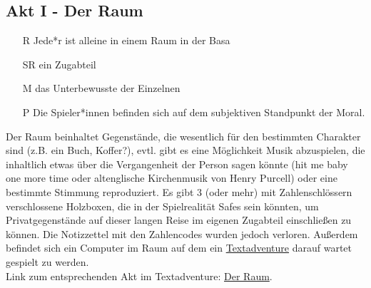 \documentclass[12pt, a4paper, openany]{report}
\begin{document}
\subsection{Akt I - Der Raum}
\begin{itemize}
\item[R] Jede*r ist alleine in einem Raum in der Basa
\item[SR] ein Zugabteil 
\item[M] das Unterbewusste der Einzelnen
\item[P] Die Spieler*innen befinden sich auf dem subjektiven Standpunkt der Moral. 
\end{itemize}
Der Raum beinhaltet Gegenstände, die wesentlich für den bestimmten Charakter sind (z.B. ein Buch, Koffer?), evtl. gibt es eine Möglichkeit Musik abzuspielen, die inhaltlich etwas über die Vergangenheit der Person sagen könnte (\glqq hit me baby one more time\grqq{} oder altenglische Kirchenmusik von Henry Purcell) oder eine bestimmte Stimmung reproduziert.
 Es gibt 3 (oder mehr) mit Zahlenschlössern verschlossene Holzboxen, die in der Spielrealität Safes sein könnten, um Privatgegenstände auf dieser langen Reise im eigenen Zugabteil einschließen zu können.
Die Notizzettel mit den Zahlencodes wurden jedoch verloren.
Außerdem befindet sich ein Computer im Raum auf dem ein \hyperref[textadventure]{Textadventure} darauf wartet gespielt zu werden.\\
Link zum entsprechenden Akt im Textadventure: \hyperref[der-raum]{Der Raum}.
\end{document}
